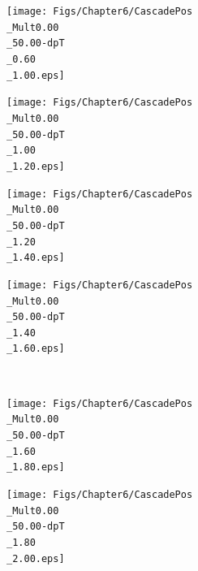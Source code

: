 \begin{landscape}
\begin{figure}[h]
	\begin{minipage}[t]{.25\textwidth}
        \hspace*{-2.5cm}
        \texttt{[image: Figs/Chapter6/CascadePos\\\_Mult0.00\\\_50.00-dpT\\\_0.60\\\_1.00.eps]}
    \end{minipage}
    \hfill
    \begin{minipage}[t]{.25\textwidth}
        \hspace*{-2.5cm}
        \texttt{[image: Figs/Chapter6/CascadePos\\\_Mult0.00\\\_50.00-dpT\\\_1.00\\\_1.20.eps]}
    \end{minipage}
    \hfill
    \begin{minipage}[t]{.25\textwidth}
		\hspace*{-2.5cm}
        \texttt{[image: Figs/Chapter6/CascadePos\\\_Mult0.00\\\_50.00-dpT\\\_1.20\\\_1.40.eps]}
    \end{minipage}
    \hfill
    \begin{minipage}[t]{.25\textwidth}
		\hspace*{-2.5cm}
        \texttt{[image: Figs/Chapter6/CascadePos\\\_Mult0.00\\\_50.00-dpT\\\_1.40\\\_1.60.eps]}
    \end{minipage}  \\
    \begin{minipage}[t]{.25\textwidth}
        \hspace*{-2.5cm}
        \texttt{[image: Figs/Chapter6/CascadePos\\\_Mult0.00\\\_50.00-dpT\\\_1.60\\\_1.80.eps]}
    \end{minipage}
    \hfill
    \begin{minipage}[t]{.25\textwidth}
        \hspace*{-2.5cm}
        \texttt{[image: Figs/Chapter6/CascadePos\\\_Mult0.00\\\_50.00-dpT\\\_1.80\\\_2.00.eps]}

\end{minipage}
\end{figure}
\end{landscape}
